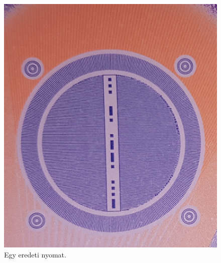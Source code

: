 \begin{figure}[h]
	
	
	\begin{minipage}[c]{0.5\linewidth}
		\centering
		\includegraphics[width=\textwidth]{img/eredeti-pelda.png}
		\caption{Egy eredeti nyomat.}
		\label{fig:eredeti.pelda}
		

\end{minipage}
\end{figure}
